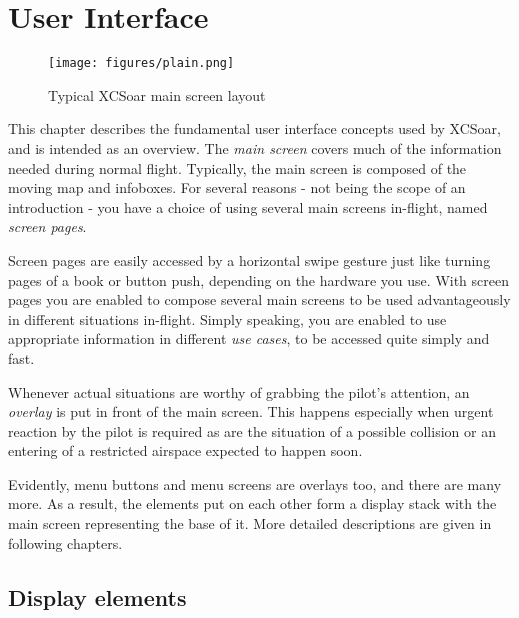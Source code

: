\chapter{User Interface}\label{cha:interface}
\begin{figure}[h]
\texttt{[image: figures/plain.png]}
\caption{Typical XCSoar main screen layout}
\end{figure}

This chapter describes the fundamental user interface concepts used by 
XCSoar, and is intended as an overview. The \emph{main screen} covers much of 
the information needed during normal flight.  Typically, the main screen is 
composed of the moving map and infoboxes. For several reasons - not being the 
scope of an introduction - you have a choice of using several main screens 
in-flight, named \emph{screen pages}.

Screen pages are easily accessed by a horizontal swipe gesture just like 
turning pages of a book or button push, depending on the hardware you use. 
With screen pages you are enabled to compose several main screens to be used 
advantageously in different situations in-flight. Simply speaking, you are 
enabled to use appropriate information in different \emph{use cases}, to be 
accessed quite simply and fast. 

Whenever actual situations are worthy of grabbing the pilot's attention, an 
\emph{overlay} is put in front of the main screen. This happens especially 
when urgent reaction by the pilot is required as are the situation of a 
possible collision or an entering of a restricted airspace expected to happen
soon.

Evidently, menu buttons and menu screens are overlays too, and there are many 
more. As a result, the elements put on each other form a display stack with 
the main screen representing the base of it. More detailed descriptions are 
given in following chapters.



\section{Display elements}
